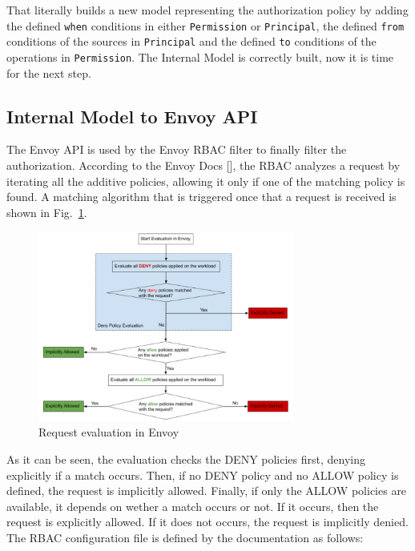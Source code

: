 \noindent That literally builds a new model representing the authorization policy by adding the defined \texttt{when} conditions in either \texttt{Permission} or \texttt{Principal}, the defined \texttt{from} conditions of the sources in \texttt{Principal} and the defined \texttt{to} conditions of the operations in \texttt{Permission}. The Internal Model is correctly built, now it is time for the next step.

\newpage

\subsection{Internal Model to Envoy API}
The Envoy API is used by the Envoy RBAC filter to finally filter the authorization. According to the Envoy Docs [], the RBAC analyzes a request by iterating all the additive policies, allowing it only if one of the matching policy is found. A matching algorithm that is triggered once that a request is received is shown in Fig.~\ref{fig:env-eval}.

\begin{figure}[ht]
    \centering
    \includegraphics[width=0.75\textwidth]{chapters/images/chp3/env-eval.png}
    \caption{Request evaluation in Envoy}
    \label{fig:env-eval}
\end{figure}

\noindent As it can be seen, the evaluation checks the DENY policies first, denying explicitly if a match occurs. Then, if no DENY policy and no ALLOW policy is defined, the request is implicitly allowed. Finally, if only the ALLOW policies are available, it depends on wether a match occurs or not. If it occurs, then the request is explicitly allowed. If it does not occurs, the request is implicitly denied.
The RBAC configuration file is defined by the documentation \cite{v2api} as follows:


